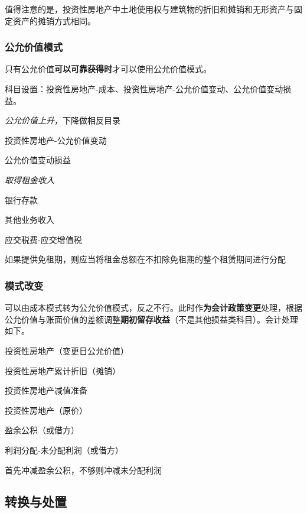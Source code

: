\documentclass[UTF8,12pt]{ctexart}
\newenvironment{Dr}{%
	\begin{list}{}%
		{
			\setlength{\leftmargin}{2em}
			\setlength{\labelwidth}{2em}
			\setlength{\labelsep}{0pt}
			\setlength{\itemindent}{0pt}
			\setlength{\listparindent}{0pt}
			\setlength{\parsep}{0pt}
			\setlength{\topsep}{0pt}
		}
		\item[\textbf{借：}]
	}{%
	\end{list}
}
\newenvironment{Cr}{%
	\begin{list}{}%
		{
			\setlength{\leftmargin}{2em}
			\setlength{\labelwidth}{2em}
			\setlength{\labelsep}{0pt}
			\setlength{\itemindent}{0pt}
			\setlength{\listparindent}{0pt}
			\setlength{\parsep}{0pt}
			\setlength{\topsep}{0pt}
		}
		\item[\textbf{贷：}]
	}{%
	\end{list}
}
\numberwithin{equation}{section} %
\numberwithin{figure}{section}
\numberwithin{table}{section}
\begin{document}
	值得注意的是，投资性房地产中土地使用权与建筑物的折旧和摊销和无形资产与固定资产的摊销方式相同。
	
	\subsubsection{公允价值模式}
	只有公允价值\textbf{可以可靠获得时}才可以使用公允价值模式。
	
	科目设置：投资性房地产-成本、投资性房地产-公允价值变动、公允价值变动损益。
	
	\textit{公允价值上升}，下降做相反目录
	
	\begin{Dr}
		投资性房地产-公允价值变动
	\end{Dr}
	\begin{Cr}
		公允价值变动损益
	\end{Cr}

	\textit{取得租金收入}
	
	\begin{Dr}
		银行存款
	\end{Dr}
	\begin{Cr}
		其他业务收入
		
		应交税费-应交增值税
	\end{Cr}
	
	如果提供免租期，则应当将租金总额在不扣除免租期的整个租赁期间进行分配
	
	\subsubsection{模式改变}
	可以由成本模式转为公允价值模式，反之不行。此时作\textbf{为会计政策变更}处理，根据公允价值与账面价值的差额调整\textbf{期初留存收益}（不是其他损益类科目）。会计处理如下。
	
	\begin{Dr}
		投资性房地产（变更日公允价值）
		
		投资性房地产累计折旧（摊销）
		
		投资性房地产减值准备
	\end{Dr}
	\begin{Cr}
		投资性房地产（原价）
		
		盈余公积（或借方）
		
		利润分配-未分配利润（或借方）
	\end{Cr}

	首先冲减盈余公积，不够则冲减未分配利润
	
	\subsection{转换与处置}
\end{document}
